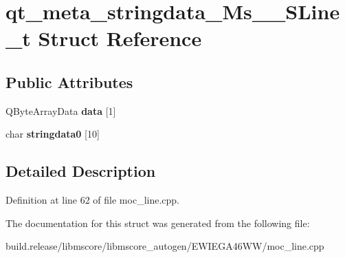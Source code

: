 \hypertarget{structqt__meta__stringdata___ms_____s_line__t}{}\section{qt\+\_\+meta\+\_\+stringdata\+\_\+\+Ms\+\_\+\+\_\+\+S\+Line\+\_\+t Struct Reference}
\label{structqt__meta__stringdata___ms_____s_line__t}
\subsection*{Public Attributes}
\begin{DoxyCompactItemize}
\item 
\mbox{\label{structqt__meta__stringdata___ms_____s_line__t_ac052a8408b870c4ab5e72cb13eef642d}} 
Q\+Byte\+Array\+Data {\bfseries data} \mbox{[}1\mbox{]}
\item 
\mbox{\label{structqt__meta__stringdata___ms_____s_line__t_a6384fd7dff9b3ed0f2606c82d14b68fd}} 
char {\bfseries stringdata0} \mbox{[}10\mbox{]}
\end{DoxyCompactItemize}


\subsection{Detailed Description}


Definition at line 62 of file moc\+\_\+line.\+cpp.



The documentation for this struct was generated from the following file\+:\begin{DoxyCompactItemize}
\item 
build.\+release/libmscore/libmscore\+\_\+autogen/\+E\+W\+I\+E\+G\+A46\+W\+W/moc\+\_\+line.\+cpp\end{DoxyCompactItemize}
